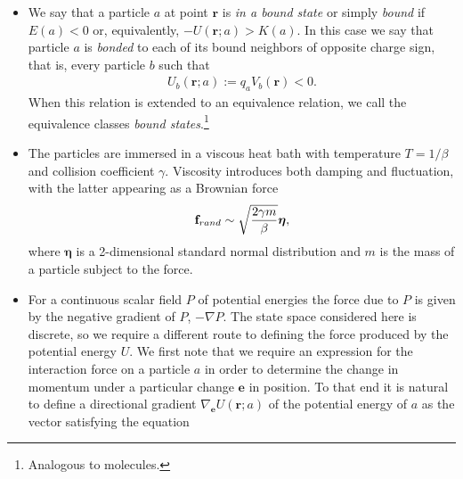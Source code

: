 \documentclass[12pt,letterpaper]{article}
\newcommand{\mb}{\mathbf}
\begin{document}
\begin{itemize}
The kinetic energy is additive over particles, while the potential energy is given by
\begin{align*}
U(A) &= \sum_{a \in A}\sum_{b}q_{a}V_{b}(\mb{r}_{a}) \\
&= \sum_{a \in A}U(a) - \sum_{i < j}q_{i}V_{j}(\mb{r}_{i}) \\
&= \sum_{a \in A}U(a) - {1 \over 2}\sum_{a \in A}U_{A}(a) \\
&= \sum_{a \in A}U(a) - {U_{A}(a) \over 2},
\end{align*}
where $i$ and $j$ refer to $a_{i}$ and $a_{j}$,
\begin{align*}
U_{A}(a) = \sum_{b \in A}q_{a}V_{b}(\mb{r}_{a}),
\end{align*}
and we may write $U(a) = U(\mb{r}_{a}; a)$ because the positions are fixed. The expression
\begin{align*}
E_{int}(A) := {1 \over 2}\sum_{a \in A}U_{A}(a)
\end{align*}
gives the interaction energy of the particles in $A$. We will ultimately not need these full derivations because the dynamics depend only on changes in energy.
\item We say that a particle $a$ at point $\mb{r}$ is {\em in a bound state} or simply {\em bound} if $E(a) < 0$ or, equivalently, $-U(\mb{r}; a) > K(a)$. In this case we say that particle $a$ is {\em bonded} to each of its bound neighbors of opposite charge sign, that is, every particle $b$ such that
\begin{align*}
U_{b}(\mb{r}; a) := q_{a}V_{b}(\mb{r}) < 0.
\end{align*}
When this relation is extended to an equivalence relation, we call the equivalence classes {\em bound states}.\footnote{Analogous to molecules.}
\item The particles are immersed in a viscous heat bath with temperature $T = 1/\beta$ and collision coefficient $\gamma$. Viscosity introduces both damping and fluctuation, with the latter appearing as a Brownian force
\begin{align*}
\mb{f}_{rand} \sim \sqrt{2\gamma m \over \beta}\boldsymbol{\eta},
\end{align*}
where $\boldsymbol{\eta}$ is a 2-dimensional standard normal distribution and $m$ is the mass of a particle subject to the force.
\item For a continuous scalar field $P$ of potential energies the force due to $P$ is given by the negative gradient of $P$, $-\nabla P$. The state space considered here is discrete, so we require a different route to defining the force produced by the potential energy $U$. We first note that we require an expression for the interaction force on a particle $a$ in order to determine the change in momentum under a particular change $\mb{e}$ in position. To that end it is natural to define a directional gradient $\nabla_{\mb{e}} U(\mb{r}; a)$ of the potential energy of $a$ as the vector satisfying the equation

\end{itemize}
\end{document}

